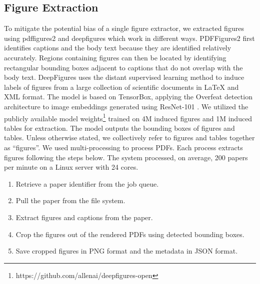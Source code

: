 \documentclass{article}
\begin{document}
\subsection{Figure Extraction}
To mitigate the potential bias of a single figure extractor, we extracted figures using {\sc pdffigures2} \cite{Clark2016PDFFigures2M}  and {\sc deepfigures} \cite{Siegel_2018} which work in different ways. {\sc PDFFigures2} first identifies  captions and the body text because they are identified relatively accurately. Regions containing figures can then be located by identifying rectangular bounding boxes adjacent to captions that do not overlap with the body text. {\sc DeepFigures}  uses the distant supervised learning method to induce labels of figures from a large collection of scientific documents in LaTeX and XML format. The model is based on TensorBox, applying the Overfeat detection architecture to image embeddings generated using ResNet-101 \cite{Siegel_2018}. We utilized the publicly available model weights\footnote{https://github.com/allenai/deepfigures-open} trained on 4M induced figures and 1M induced tables for extraction. The model outputs the bounding boxes of figures and tables. Unless otherwise stated, we collectively refer to figures and tables together as ``figures''. 
We used multi-processing to process PDFs. Each process extracts figures following the steps below. The system processed, on average, 200 papers per minute on a Linux server with 24 cores.
\begin{enumerate}[leftmargin=*,noitemsep]
    \item Retrieve a paper identifier from the job queue.
    \item Pull the paper from the file system.
    \item Extract figures and captions from the paper.
    \item Crop the figures out of the rendered PDFs using detected bounding boxes.
    \item Save cropped figures in PNG format and the metadata in JSON format. 
\end{enumerate}

\end{document}

